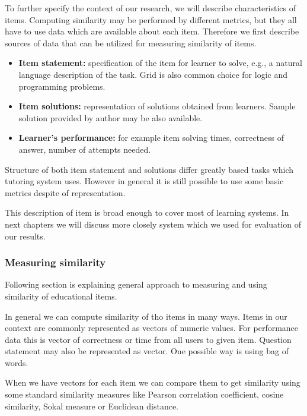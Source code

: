 \documentclass[
  digital, %
  table,   %
  nolof,     %
  nolot,     %
  nocover
]{fithesis3}
\begin{document}

To further specify the context of our research, we will describe
characteristics of items. Computing similarity may be performed by different metrics, but they all have to use data which are available about each item. Therefore we first describe
sources of data that can be utilized for measuring similarity of items.

\begin{itemize}
\item
  \textbf{Item statement:} specification of the item for learner
  to solve, e.g., a natural language description of the task. Grid is also common choice for logic and programming problems.
\item
  \textbf{Item solutions:} representation of solutions obtained from
  learners. Sample solution provided by author may be also available.
\item
  \textbf{Learner's performance:} for example item solving times,
  correctness of answer, number of attempts needed.
\end{itemize}

Structure of both item statement and solutions differ greatly based tasks which tutoring system uses. However in general it is still possible to use some basic metrics despite of representation.

This description of item is broad enough to cover most of learning
systems. In next chapters we will discuss more closely system which we used for evaluation of our results.

\subsubsection{Measuring similarity}\label{measuring-similarity}

Following section is explaining general approach to measuring and using similarity of educational
items.


In general we can compute similarity of tho items in many ways. Items in our context are commonly represented as vectors of numeric values. For performance data this is vector of correctness or time from all users to given item. Question statement may also be represented as vector. One possible way is using bag of words.

When we have vectors for each item we can compare them to get similarity using some standard similarity measures like Pearson correlation coefficient, cosine similarity, Sokal measure or Euclidean distance.
\end{document}
